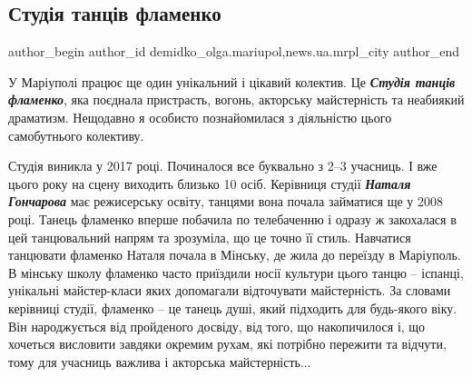  
 
 
 
 
 
\subsection{Студія танців фламенко}
\label{sec:26_07_2021.stz.news.ua.mrpl_city.1.studia_tanciv_flamenko}
 
\ifcmt
 author_begin
   author_id demidko_olga.mariupol,news.ua.mrpl_city
 author_end
\fi


У Маріуполі працює ще один унікальний і цікавий колектив. Це \emph{\textbf{Студія танців
фламенко}}, яка поєднала пристрасть, вогонь, акторську майстерність та неабиякий
драматизм. Нещодавно я особисто познайомилася з діяльністю цього самобутнього
колективу.


Студія виникла у 2017 році. Починалося все буквально з 2–3 учасниць. І вже
цього року на сцену виходить близько 10 осіб. Керівниця студії \emph{\textbf{Наталя Гончарова}}
має режисерську освіту, танцями вона почала займатися ще у 2008 році. Танець
фламенко вперше побачила по телебаченню і одразу ж закохалася в цей
танцювальний напрям та зрозуміла, що це точно її стиль. Навчатися танцювати
фламенко Наталя почала в Мінську, де жила до переїзду в Маріуполь. В мінську
школу фламенко часто приїздили носії культури цього танцю – іспанці, унікальні
майстер-класи яких допомагали відточувати майстерність. За словами керівниці
студії, фламенко – це танець душі, який підходить для будь-якого віку. Він
народжується від пройденого досвіду, від того, що накопичилося і, що хочеться
висловити завдяки окремим рухам, які потрібно пережити та відчути, тому для
учасниць важлива і акторська майстерність... 


